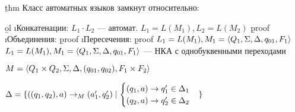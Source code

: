 




\b{thm}
Класс автоматных языков замкнут относительно:

\b{ol}
\i Конкатенации: $L_1 \cdot L_2$ --- автомат. $L_1 = L(M_1), L_2 = L(M_2)$
\b{proof}
\i Объединения:
\b{proof}
\i Пересечения:
\b{proof}
$L_1 = L(M_1), M_1 = \<Q_1, \Sigma, \Delta, q_{01}, F_1 \>$
$L_1 = L(M_1), M_1 = \<Q_1, \Sigma, \Delta, q_{01}, F_1 \>$ --- НКА с однобуквенными переходами

$M=\<Q_1\times Q_2, \Sigma, \Delta, (q_{01}, q_{02}), F_1 \times F_2 \>$

$\Delta = \{ ((q_1, q_2), a) \to_M (a_1', q_2') \mid \b{cases} (q_1, a) \to q_1' \in \Delta_1 \\ (q_2, a) \to q_2' \in \Delta_2 \e{cases} \}$

